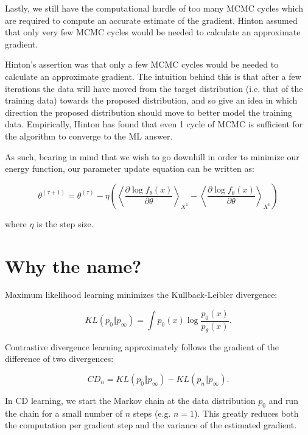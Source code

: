 \documentclass[11pt]{article}
\begin{document}
Lastly, we still have the computational hurdle of too many MCMC cycles which are required to compute an accurate estimate of the gradient. Hinton assumed that only very few MCMC cycles would be needed to calculate an approximate gradient.

Hinton's assertion was that only a few MCMC cycles would be needed to calculate an approximate gradient. The intuition behind this is that after
a few iterations the data will have moved from the target distribution (i.e. that of the training data) towards the proposed distribution, and so give an idea in which direction the proposed distribution should move to better model the training data. Empirically, Hinton has found that even 1 cycle of MCMC is sufficient for the algorithm to converge to the ML answer. 

As such, bearing in mind that we wish to go downhill in order to minimize our energy function, our parameter update equation can be written as:

\begin{equation}
\theta^{(\tau+1)} = \theta^{(\tau)} - \eta \left( \left\langle \frac{\partial\log f_\theta(x)}{\partial\theta} \right\rangle_{X^1} - \left\langle \frac{\partial\log f_\theta (x)}{\partial\theta} \right\rangle_{X^0} \right)
\end{equation}

where $\eta$ is the step size.

\section{Why the name?}

Maximum likelihood learning minimizes the Kullback-Leibler divergence:

\begin{equation}
KL\left(p_0 \Vert p_\infty \right) = \int p_0(x) \log\frac{p_0(x)}{p_\theta(x)}.
\end{equation}

Contrastive divergence learning approximately follows the gradient of the difference of two divergences:

\begin{equation}
CD_n = KL\left(p_0 \Vert p_\infty \right) - KL\left(p_n \Vert p_\infty \right).
\end{equation}

In CD learning, we start the Markov chain at the data distribution $p_0$ and run the chain for a small number of $n$ steps (e.g. $n=1$). This greatly reduces both the computation per gradient step and the variance of the estimated gradient.


 
\end{document}
